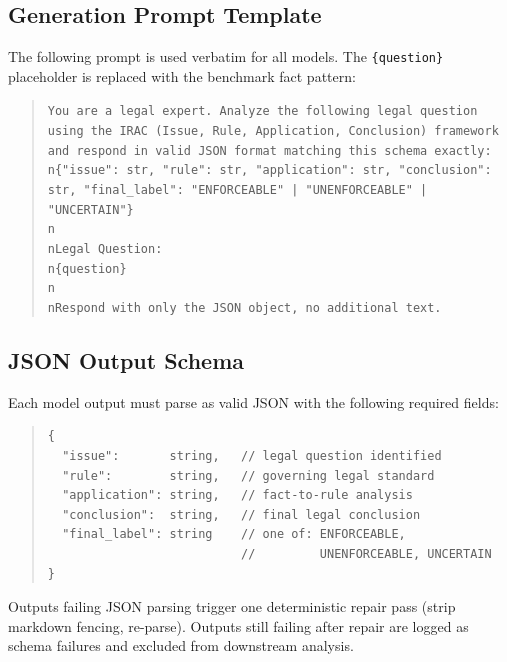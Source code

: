 \documentclass[11pt]{article}
\begin{document}
\subsection{Generation Prompt Template}
The following prompt is used verbatim for all models. The \texttt{\{question\}} placeholder is replaced with the benchmark fact pattern:

\begin{quote}\small
\texttt{You are a legal expert. Analyze the following legal question using the IRAC (Issue, Rule, Application, Conclusion) framework and respond in valid JSON format matching this schema exactly:\\n\{"issue": str, "rule": str, "application": str, "conclusion": str, "final\_label": "ENFORCEABLE" | "UNENFORCEABLE" | "UNCERTAIN"\}\\n\\nLegal Question:\\n\{question\}\\n\\nRespond with only the JSON object, no additional text.}
\end{quote}

\subsection{JSON Output Schema}
Each model output must parse as valid JSON with the following required fields:

\begin{quote}\small
\begin{verbatim}
{
  "issue":       string,   // legal question identified
  "rule":        string,   // governing legal standard
  "application": string,   // fact-to-rule analysis
  "conclusion":  string,   // final legal conclusion
  "final_label": string    // one of: ENFORCEABLE,
                           //         UNENFORCEABLE, UNCERTAIN
}
\end{verbatim}
\end{quote}

Outputs failing JSON parsing trigger one deterministic repair pass (strip markdown fencing, re-parse). Outputs still failing after repair are logged as schema failures and excluded from downstream analysis.
\end{document}
